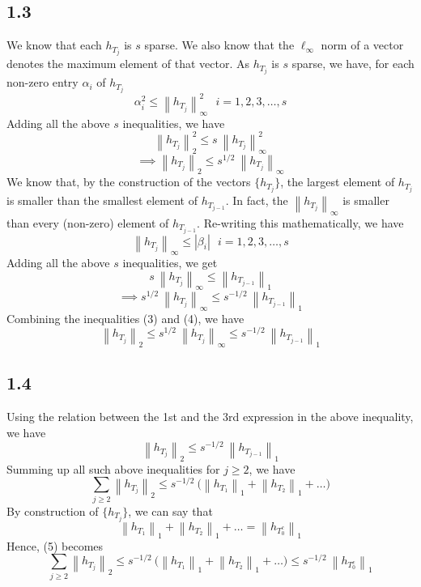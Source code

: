 \documentclass[12pt]{article}
\newcommand{\norm}[1]{\left\lVert #1 \right\rVert}
\begin{document}
\subsection*{1.3}
We know that each $h_{T_j}$ is $s$ sparse. We also know that the $\ell_{\infty}$ norm of a vector denotes the maximum element of that vector. As $h_{T_j}$ is $s$ sparse, we have, for each non-zero entry $\alpha_i$ of $h_{T_j}$
$$\alpha_i^2 \leq \norm{h_{T_j}}_{\infty}^2 \:\:\: i = 1, 2, 3, \ldots, s$$
Adding all the above $s$ inequalities, we have
$$\norm{h_{T_j}}_2^2 \leq s \: \norm{h_{T_j}}_{\infty}^2$$
\begin{equation}
	\implies \norm{h_{T_j}}_2 \leq s^{1/2} \: \norm{h_{T_j}}_{\infty}
\end{equation}
We know that, by the construction of the vectors $\{h_{T_j}\}$, the largest element of $h_{T_j}$ is smaller than the smallest element of $h_{T_{j-1}}$. In fact, the $\norm{h_{T_j}}_{\infty}$ is smaller than every (non-zero) element of $h_{T_{j-1}}$. Re-writing this mathematically, we have
$$\norm{h_{T_j}}_{\infty} \leq |\beta_i| \:\:\: i = 1, 2, 3, \ldots, s$$
Adding all the above $s$ inequalities, we get
$$s\: \norm{h_{T_j}}_{\infty} \leq \norm{h_{T_{j-1}}}_{1}$$
\begin{equation}
\implies s^{1/2}\: \norm{h_{T_j}}_{\infty} \leq  s^{-1/2} \:\norm{h_{T_{j-1}}}_{1}
\end{equation}
Combining the inequalities (3) and (4), we have
$$\norm{h_{T_j}}_2 \leq s^{1/2} \: \norm{h_{T_j}}_{\infty} \leq  s^{-1/2} \:\norm{h_{T_{j-1}}}_{1}$$
\subsection*{1.4}
Using the relation between the 1st and the 3rd expression in the above inequality, we have
$$\norm{h_{T_j}}_2 \leq s^{-1/2} \:\norm{h_{T_{j-1}}}_{1}$$
Summing up all such above inequalities for $j \geq 2$, we have
\begin{equation}
\sum \limits_{j \geq 2} \norm{h_{T_j}}_2 \leq s^{-1/2} \: \bigg(\norm{h_{T_1}}_1 + \norm{h_{T_2}}_1 + \ldots\bigg)
\end{equation}
By construction of $\{h_{T_{j}}\}$, we can say that 
$$\norm{h_{T_1}}_1 + \norm{h_{T_2}}_1 + \ldots = \norm{h_{T_0^c}}_1$$ 
Hence, (5) becomes
\begin{equation}
\sum \limits_{j \geq 2} \norm{h_{T_j}}_2 \leq s^{-1/2} \: \bigg(\norm{h_{T_1}}_1 + \norm{h_{T_2}}_1 + \ldots\bigg) \leq s^{-1/2} \:\norm{h_{T_0^c}}_1
\end{equation}
\end{document}
